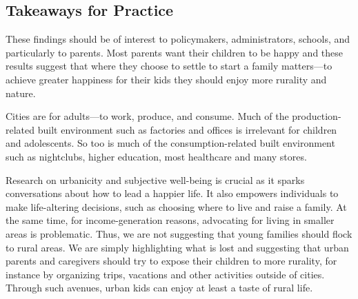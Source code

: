 \documentclass[10pt, letterpaper]{article}
\begin{document}
\begin{spacing}{1.4}
\section*{Takeaways for Practice}


These findings should be of interest to policymakers, administrators, schools, and particularly to parents. Most parents want their children to be happy and these results suggest that where they choose to settle to start a family matters---to achieve greater happiness for their kids they should enjoy more rurality and nature. 

Cities are  for adults---to work, produce, and consume. Much of  the production-related built environment such as factories and offices is irrelevant for children and adolescents. %
 So too is much of the consumption-related built environment  such as
 nightclubs, higher education, most healthcare and many stores. 

Research on urbanicity and subjective well-being is crucial as it sparks
conversations about how to lead a happier life. It also empowers individuals to
make life-altering decisions, such as choosing where to live and raise a
family. At the same time, for income-generation reasons, advocating for living
in smaller areas is  problematic. Thus, we are not suggesting that young
families should flock to rural areas. We are simply highlighting what is lost and suggesting that urban parents and caregivers should try to expose their children to more rurality, for instance by organizing
trips, vacations and other activities outside of cities. Through such avenues,
urban kids can enjoy at least a taste of rural life. 


                                                       



\end{spacing}
\end{document}

